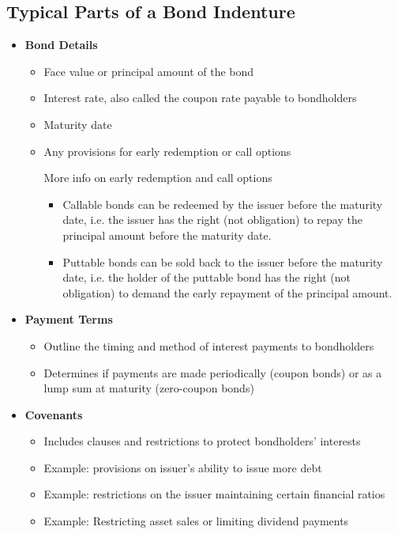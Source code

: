 \subsection*{Typical Parts of a Bond Indenture}
\begin{itemize}
    \item \textbf{Bond Details}
    \begin{itemize}
        \item Face value or principal amount of the bond
        \item Interest rate, also called the coupon rate payable to bondholders
        \item Maturity date
        \item Any provisions for early redemption or call options
\begin{sidenotebox}{More info on early redemption and call options}
    \begin{itemize}
        \item Callable bonds can be redeemed by the issuer before the maturity date, i.e. the issuer has the right (not obligation) to repay the principal amount before the maturity date.
        \item Puttable bonds can be sold back to the issuer before the maturity date, i.e. the holder of the puttable bond has the right (not obligation) to demand the early repayment of the principal amount.
    \end{itemize}
\end{sidenotebox}
    \end{itemize}
    \item \textbf{Payment Terms}
    \begin{itemize}
        \item Outline the timing and method of interest payments to bondholders
        \item Determines if payments are made periodically (coupon bonds) or as a lump sum at maturity (zero-coupon bonds)
    \end{itemize}
    \item \textbf{Covenants}
    \begin{itemize}
        \item Includes clauses and restrictions to protect bondholders' interests
        \item Example: provisions on issuer's ability to issue more debt
        \item Example: restrictions on the issuer maintaining certain financial ratios
        \item Example: Restricting asset sales or limiting dividend payments

\end{itemize}
\end{itemize}
